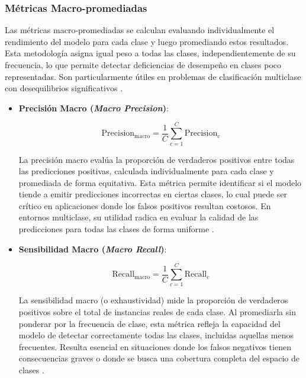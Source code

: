 \subsubsection*{Métricas Macro-promediadas}

Las métricas macro-promediadas se calculan evaluando individualmente el rendimiento del modelo para cada clase y luego promediando estos resultados. Esta metodología asigna igual peso a todas las clases, independientemente de su frecuencia, lo que permite detectar deficiencias de desempeño en clases poco representadas. Son particularmente útiles en problemas de clasificación multiclase con desequilibrios significativos \cite{Japkowicz2002}.

\begin{itemize}

\item \textbf{Precisión Macro (\textit{Macro Precision})}:

\begin{equation}
\text{Precision}_{\text{macro}} = \frac{1}{C} \sum_{c=1}^{C} \text{Precision}_c
\end{equation}

La precisión macro evalúa la proporción de verdaderos positivos entre todas las predicciones positivas, calculada individualmente para cada clase y promediada de forma equitativa. Esta métrica permite identificar si el modelo tiende a emitir predicciones incorrectas en ciertas clases, lo cual puede ser crítico en aplicaciones donde los falsos positivos resultan costosos. En entornos multiclase, su utilidad radica en evaluar la calidad de las predicciones para todas las clases de forma uniforme \cite{He2009}.

\item \textbf{Sensibilidad Macro (\textit{Macro Recall})}:

\begin{equation}
\text{Recall}_{\text{macro}} = \frac{1}{C} \sum_{c=1}^{C} \text{Recall}_c
\end{equation}

La sensibilidad macro (o exhaustividad) mide la proporción de verdaderos positivos sobre el total de instancias reales de cada clase. Al promediarla sin ponderar por la frecuencia de clase, esta métrica refleja la capacidad del modelo de detectar correctamente todas las clases, incluidas aquellas menos frecuentes. Resulta esencial en situaciones donde los falsos negativos tienen consecuencias graves o donde se busca una cobertura completa del espacio de clases \cite{powers2011evaluation}.


\end{itemize}
